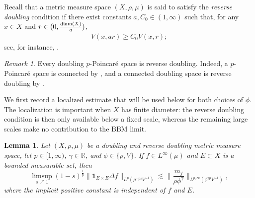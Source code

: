 \documentclass[11pt]{amsart}
\newtheorem{lemma}[theorem]{Lemma}
\theoremstyle{definition}
\theoremstyle{remark}
\newtheorem{remark}[theorem]{Remark}
\numberwithin{equation}{section}
\newcommand{\Norm}[2]{\|#1\|_{#2}}
\begin{document}
Recall that a metric measure space $(X,\rho,\mu)$
is said to satisfy the \emph{reverse doubling} condition if
there exist constants $a,C_0\in (1,\infty)$ such that, for any $x\in X$ and
$r\in(0,\frac{{\rm diam}(X)}{a})$,
\begin{align}\label{rdb}
V(x,ar)\ge C_0V(x,r);
\end{align}
see, for instance, \cite[Definition 1.1(ii)]{YZ:11}.

\begin{remark}\label{rem:Poincare>RD}
Every doubling $p$-Poincar\'e space is reverse doubling. Indeed, a $p$-Poincar\'e space
is connected by \cite[Proposition 4.2]{BB:book}, and a connected doubling space is reverse
doubling by \cite[Corollary 3.8]{BB:book}.
\end{remark}

We first record a localized estimate that will be used below for both choices
of $\phi$.  The localization is important when $X$ has finite diameter: the
reverse doubling condition is then only available below a fixed scale, whereas
the remaining large scales make no contribution to the BBM limit.

\begin{lemma}\label{lem:BSVY161}
Let $(X,\rho,\mu)$ be a doubling and reverse doubling metric measure space,
let $p\in[1,\infty)$, $\gamma\in\mathbb R$, and $\phi\in\{\rho,V\}$.
If $f\in L^\infty(\mu)$ and $E\subset X$ is a bounded measurable set, then
\begin{equation}\label{eq:mean-to-difference-BBM}
 \limsup_{s\nearrow 1}(1-s)^{\frac1p}
 \Norm{\mathbf{1}_{E\times E}\Delta f}{L^p(\rho^{-ps}V^{-1})}
 \lesssim
 \Big\|\frac{m_f}{\rho\phi^\gamma}\Big\|_
 {L^{p,\infty}(\phi^{\gamma p}V^{-1})},
\end{equation}
where the implicit positive constant is independent of $f$ and $E$.
\end{lemma}
\end{document}
